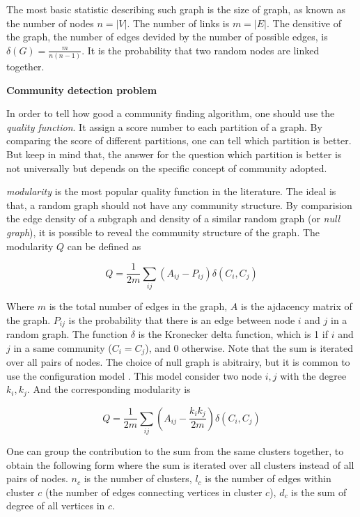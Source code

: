 The most basic statistic describing such graph is the size of graph, as known as the number of nodes $n = |V|$.
The number of links is $m = |E|$.
The densitive of the graph, the number of edges devided by the number of possible edges, is $\delta(G) = \frac{m}{n(n-1)}$.
It is the probability that two random nodes are linked together.



\textbf{Community detection problem}

In order to tell how good a community finding algorithm, one should use the \textit{quality function}.
It assign a score number to each partition of a graph.
By comparing the score of different partitions, one can tell which partition is better.
But keep in mind that, the answer for the question which partition is better is not universally
but depends on the specific concept of community adopted.

\textit{modularity}\cite{newman2004} is the most popular quality function in the literature.
The ideal is that, a random graph should not have any community structure.
By comparision the edge density of a subgraph and density of a similar random graph (or \textit{null graph}),
it is possible to reveal the community structure of the graph.
The modularity $Q$ can be defined as

\begin{equation}
	Q = \frac{1}{2m} \sum_{ij} \left(A_{ij} - P_{ij}\right) \delta(C_i, C_j)
\end{equation}

Where $m$ is the total number of edges in the graph,
$A$ is the ajdacency matrix of the graph.
$P_{ij}$ is the probability that there is an edge between node $i$ and $j$ in a random graph.
The function $\delta$ is the Kronecker delta function,
which is 1 if $i$ and $j$ in a same community ($C_i = C_j$), and 0 otherwise.
Note that the sum is iterated over all pairs of nodes.
The choice of null graph is abitrairy, but it is common to use the configuration model \cite{newman2004}.
This model consider two node $i, j$ with the degree $k_i, k_j$.
And the corresponding modularity is

\begin{equation}
	Q = \frac{1}{2m} \sum_{ij} \left(A_{ij} - \frac{k_i k_j}{2m}\right) \delta(C_i, C_j)
\end{equation}

One can group the contribution to the sum from the same clusters together,
to obtain the following form where the sum is iterated over all clusters instead of all pairs of nodes.
$n_c$ is the number of clusters, $l_c$ is the number of edges within cluster $c$ (the number of edges connecting vertices in cluster $c$),
$d_c$ is the sum of degree of all vertices in $c$.


